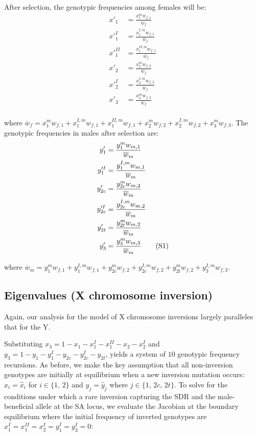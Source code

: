 \documentclass{article}
\newcommand\numberthis{\addtocounter{equation}{1}\tag{\theequation}}
\begin{document}
\noindent After selection, the genotypic frequencies among females will be:
\begin{align*}
	x'_{1}     &= \frac{x^m_1 w_{f,1}     }{\overline{w}_{f}} \\
	x'^{I}_{1}  &= \frac{x^{I,m}_1 w_{f,1} }{\overline{w}_{f}} \\
	x'^{II}_{1} &= \frac{x^{II,m}_1 w_{f,1}}{\overline{w}_{f}} \\
	x'_{2}      &= \frac{x^m_2 w_{f,2}     }{\overline{w}_{f}} \\
	x'^{I}_{2}  &= \frac{x^{I,m}_2 w_{f,2} }{\overline{w}_{f}} \\
	x'_{3}      &= \frac{x^m_3 w_{f,3}     }{\overline{w}_{f}} \\
\end{align*}
    
\noindent where $\overline{w}_{f} = x^m_1 w_{f,1} + x^{I,m}_1 w_{f,1} + x^{II,m}_1 w_{f,1} + x^m_2 w_{f,2} + x^{I,m}_2 w_{f,2} + x^m_3 w_{f,3} $. The genotypic frequencies in males after selection are:
\begin{align*}
	y'_{1}       &= \frac{y^m_1 w_{m,1}       }{\overline{w}_{m}} \\
	y'^I_{1}     &= \frac{y^{I,m}_{1} w_{m,1} }{\overline{w}_{m}} \\
	y'_{2c}      &= \frac{y^{m}_{2c} w_{m,2}  }{\overline{w}_{m}}  \\
	y'^I_{2c}    &= \frac{y^{I,m}_{2c} w_{m,2}}{\overline{w}_{m}} \\
	y'_{2t}      &= \frac{y^m_{2t} w_{m,2}    }{\overline{w}_{m}} \\
	y'_{3}       &= \frac{y^{m}_3 w_{m,3}   }{\overline{w}_{m}} \numberthis
\end{align*}
  
\noindent where $\overline{w}_{m} = y^m_1 w_{f,1} + y^{I,m}_{1} w_{f,1} + y^{m}_{2c} w_{f,2} + y^{I,m}_{2c} w_{f,2} + y^m_{2t} w_{f,2} + y^{I,m}_3 w_{f,3} $.



\subsection{Eigenvalues (X chromosome inversion)}

Again, our analysis for the model of X chromosome inversions largely paralleles that for the Y.

Substituting $x_3 = 1 - x_{1} - x^I_{1} - x^{II}_{1} - x_{2} - x^I_{2}$ and $y_3 = 1 - y_1 - y^I_1 - y_{2c} - y^I_{2c} - y_{2t}$, yields a system of $10$ genotypic frequency recursions. As before, we make the key assumption that all non-inversion genotypes are initially at equilibrium when a new inversion mutation occurs: $x_i = \hat{x}_i$ for $i \in \{1,\,2 \}$ and $y_j = \hat{y}_j$ where $j \in \{ 1,\,2c,\,2t \}$. To solve for the conditions under which a rare inversion capturing the SDR and the male-beneficial allele at the SA locus, we evaluate the Jacobian at the boundary equilibrium where the initial frequency of inverted genotypes are $x^{I}_{1} = x^{II}_{1} = x^I_2 = y^I_1 = y^I_3 = 0$:
\end{document}
